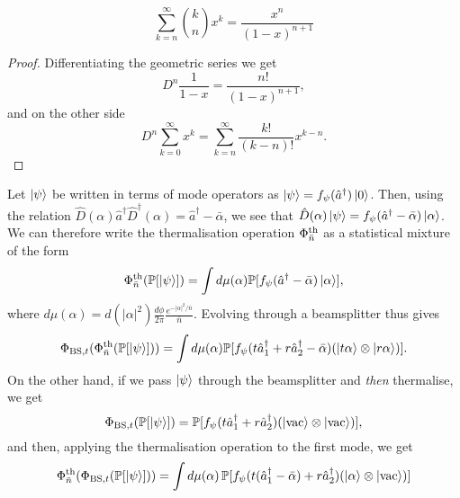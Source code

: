 \documentclass[a4paper]{report}
\newcommand{\PP}{\mathbb{P}}
\begin{document}
\begin{prop}
	\begin{equation}
		\sum_{k=n}^\infty \binom{k}{n} x^k
		= \frac{x^n}{(1-x)^{n+1}}
	\end{equation}
	\label{eq:generalised_geometric_series}
\end{prop}
\begin{proof}
	Differentiating the geometric series we get
	\begin{equation}
		D^n \frac{1}{1-x} = \frac{n!}{(1-x)^{n+1}},
	\end{equation}
	and on the other side
	\begin{equation}
		D^n \sum_{k=0}^\infty x^k
		= \sum_{k=n}^\infty \frac{k!}{(k-n)!} x^{k-n}.
	\end{equation}
\end{proof}

Let $\ket\psi$ be written in terms of mode operators as
$\ket\psi=f_\psi(\hat a^\dagger)\ket0$.
Then, using the relation $\hat D(\alpha) \hat a^\dagger \hat D^\dagger(\alpha)=\hat a^\dagger -\bar\alpha$, we see that
$\hat D(\alpha)\ket\psi=f_\psi(\hat a^\dagger-\bar\alpha)\ket\alpha$.
We can therefore write the thermalisation operation $\Phi^{\rm th}_{\bar n}$ as a statistical mixture of the form
\begin{equation}
	\Phi^{\rm th}_{\bar n}(\PP[\ket\psi])
	= \int d\mu(\alpha)
	\PP[f_\psi(\hat a^\dagger-\bar\alpha)\ket\alpha],
\end{equation}
where $d\mu(\alpha)=d(|\alpha|^2)\frac{d\phi}{2\pi} \frac{e^{-|\alpha|^2/\bar n}}{\bar n}$.
Evolving through a beamsplitter thus gives
\begin{equation}
	\Phi_{{\rm BS},t}(\Phi_{\bar n}^{\rm th}(\PP[\ket\psi]))
	= \int d\mu(\alpha)
	\PP[f_\psi(t \hat a_1^\dagger + r \hat a_2^\dagger-\bar\alpha)
	(\ket{t\alpha}\otimes\ket{r\alpha})
	].
\end{equation}
On the other hand, if we pass $\ket\psi$ through the beamsplitter and \emph{then} thermalise, we get
\begin{equation}
	\Phi_{{\rm BS},t}(\PP[\ket\psi])
	= \PP[f_{\psi}(t \hat a_1^\dagger + r\hat a_2^\dagger)
	(\ket{\rm vac}\otimes \ket{\rm vac})
	],
\end{equation}
and then, applying the thermalisation operation to the first mode, we get
\begin{equation}
	\Phi_{\bar n}^{\rm th}(\Phi_{{\rm BS},t}(\PP[\ket\psi]))
	= \int d\mu(\alpha)\,
	\PP[
	f_\psi(t (\hat a_1^\dagger-\bar\alpha) + r\hat a_2^\dagger)
	(\ket\alpha\otimes\ket{\rm vac})
	]
\end{equation}
\end{document}
